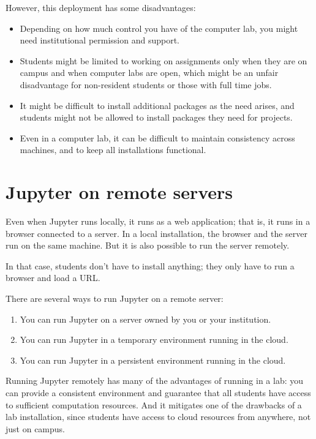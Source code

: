 \documentclass[]{book}
\providecommand{\tightlist}{%
  \setlength{\itemsep}{0pt}\setlength{\parskip}{0pt}}
\begin{document}
However, this deployment has some disadvantages:

\begin{itemize}
\item
  Depending on how much control you have of the computer lab, you
  might need institutional permission and support.
\item
  Students might be limited to working on assignments only when they
  are on campus and when computer labs are open, which might be an
  unfair disadvantage for non-resident students or those with full
  time jobs.
\item
  It might be difficult to install additional packages as the need
  arises, and students might not be allowed to install packages they
  need for projects.
\item
  Even in a computer lab, it can be difficult to maintain consistency
  across machines, and to keep all installations functional.
\end{itemize}

\hypertarget{jupyter-on-remote-servers}{%
\section{Jupyter on remote servers}\label{jupyter-on-remote-servers}}

Even when Jupyter runs locally, it runs as a web application; that is,
it runs in a browser connected to a server. In a local installation,
the browser and the server run on the same machine. But it is also
possible to run the server remotely.

In that case, students don't have to install anything; they only have
to run a browser and load a URL.

There are several ways to run Jupyter on a remote server:

\begin{enumerate}
\def\labelenumi{\arabic{enumi}.}
\tightlist
\item
  You can run Jupyter on a server owned by you or your institution.
\item
  You can run Jupyter in a temporary environment running in the cloud.
\item
  You can run Jupyter in a persistent environment running in the cloud.
\end{enumerate}

Running Jupyter remotely has many of the advantages of running in a
lab: you can provide a consistent environment and guarantee that all
students have access to sufficient computation resources. And it
mitigates one of the drawbacks of a lab installation, since students
have access to cloud resources from anywhere, not just on campus.
\end{document}
